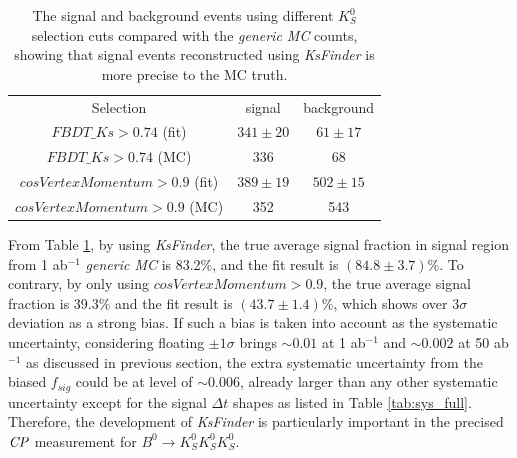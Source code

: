 \begin{table}[htpb]
	\centering
	\caption{The signal and background events using different $K_S^0$ selection cuts compared with the \textit{generic MC} counts, showing that signal events reconstructed using \textit{KsFinder} is more precise to the MC truth. }
	\label{tab:ksbias}
	\begin{tabular}{c| c |c}
		\hline
		Selection & signal  & background \\
		${FBDT\_Ks>0.74}$ (fit) & $341\pm20$ & $61\pm17$ \\
		${FBDT\_Ks>0.74}$ (MC) & 336 & 68\\
		${cosVertexMomentum>0.9}$ (fit) & $389\pm19$ & $502\pm15$\\
		${cosVertexMomentum>0.9}$ (MC) & 352 & 543\\
		\hline
	\end{tabular}
\end{table}

From Table \ref{tab:ksbias}, by using \textit{KsFinder}, the true average signal fraction in signal region from 1 ab$^{-1}$ \textit{generic MC} is 83.2\%, and the fit result is $(84.8\pm3.7)\%$. To contrary, by only using ${cosVertexMomentum>0.9}$, the true average signal fraction is 39.3\% and the fit result is $(43.7\pm1.4)\%$, which shows over $3\sigma$ deviation as a strong bias. If such a bias is taken into account as the systematic uncertainty, considering floating $\pm 1\sigma$ brings $\sim 0.01$ at 1 ab$^{-1}$ and $\sim 0.002$ at 50 ab$^{-1}$ as discussed in previous section, the extra systematic uncertainty from the biased $f_{sig}$ could be at level of $\sim 0.006$, already larger than any other systematic uncertainty except for the signal $\Delta t$ shapes as listed in Table \ref{tab:sys_full}. Therefore, the development of \textit{KsFinder} is particularly important in the precised $\it{CP}$ measurement for $B^0 \to K_S^0  K_S^0  K_S^0$.



